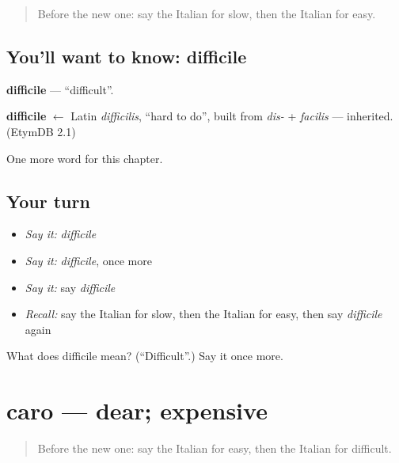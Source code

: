 \label{lesson:IT-C74-difficile}



\begin{quote}
Before the new one: say the Italian for slow, then the Italian for easy.
\end{quote}

\subsection*{You'll want to know: difficile}
\textbf{difficile} — \textquotedblleft{}difficult\textquotedblright{}.

\begin{cousinweb}
\textbf{difficile} $\leftarrow$ Latin \emph{difficilis}, \textquotedblleft{}hard to do\textquotedblright{}, built from \emph{dis-} + \emph{facilis} — inherited. (EtymDB 2.1)
\end{cousinweb}

\begin{grammarlens}[title={What you've built}]
One more word for this chapter.
\end{grammarlens}

\subsection*{Your turn}
\begin{itemize}
\raggedright
  \item \emph{Say it:} \emph{difficile}
  \item \emph{Say it:} \emph{difficile}, once more
  \item \emph{Say it:} say \emph{difficile}
  \item \emph{Recall:} say the Italian for slow, then the Italian for easy, then say \emph{difficile} again
\end{itemize}

\begin{tcolorbox}[breakable,colback=teal!4,colframe=teal!35!black,title={Before you move on}]
What does difficile mean? (\textquotedblleft{}Difficult\textquotedblright{}.) Say it once more.
\end{tcolorbox}
\section[caro]{caro — dear; expensive}

\label{lesson:IT-C74-caro}



\begin{quote}
Before the new one: say the Italian for easy, then the Italian for difficult.
\end{quote}

